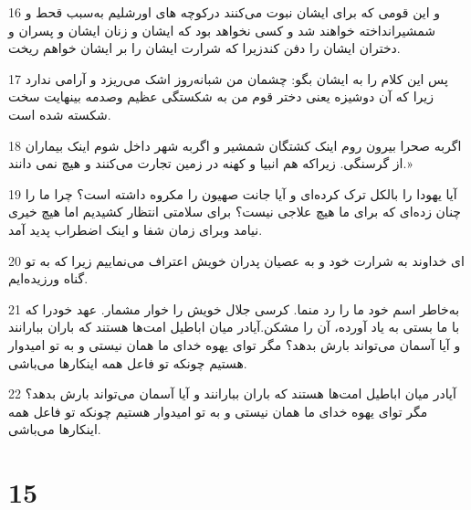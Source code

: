 \par 16 و این قومی که برای ایشان نبوت می‌کنند درکوچه های اورشلیم به‌سبب قحط و شمشیرانداخته خواهند شد و کسی نخواهد بود که ایشان و زنان ایشان و پسران و دختران ایشان را دفن کندزیرا که شرارت ایشان را بر ایشان خواهم ریخت.
\par 17 پس این کلام را به ایشان بگو: چشمان من شبانه‌روز اشک می‌ریزد و آرامی ندارد زیرا که آن دوشیزه یعنی دختر قوم من به شکستگی عظیم وصدمه بینهایت سخت شکسته شده است.
\par 18 اگربه صحرا بیرون روم اینک کشتگان شمشیر و اگربه شهر داخل شوم اینک بیماران از گرسنگی. زیراکه هم انبیا و کهنه در زمین تجارت می‌کنند و هیچ نمی دانند.»
\par 19 آیا یهودا را بالکل ترک کرده‌ای و آیا جانت صهیون را مکروه داشته است؟ چرا ما را چنان زده‌ای که برای ما هیچ علاجی نیست؟ برای سلامتی انتظار کشیدیم اما هیچ خیری نیامد وبرای زمان شفا و اینک اضطراب پدید آمد. 
\par 20 ‌ای خداوند به شرارت خود و به عصیان پدران خویش اعتراف می‌نماییم زیرا که به تو گناه ورزیده‌ایم.
\par 21 به‌خاطر اسم خود ما را رد منما. کرسی جلال خویش را خوار مشمار. عهد خودرا که با ما بستی به یاد آورده، آن را مشکن.آیادر میان اباطیل امت‌ها هستند که باران ببارانند و آیا آسمان می‌تواند بارش بدهد؟ مگر تو‌ای یهوه خدای ما همان نیستی و به تو امیدوار هستیم چونکه تو فاعل همه اینکارها می‌باشی.
\par 22 آیادر میان اباطیل امت‌ها هستند که باران ببارانند و آیا آسمان می‌تواند بارش بدهد؟ مگر تو‌ای یهوه خدای ما همان نیستی و به تو امیدوار هستیم چونکه تو فاعل همه اینکارها می‌باشی.
 
\chapter{15}

